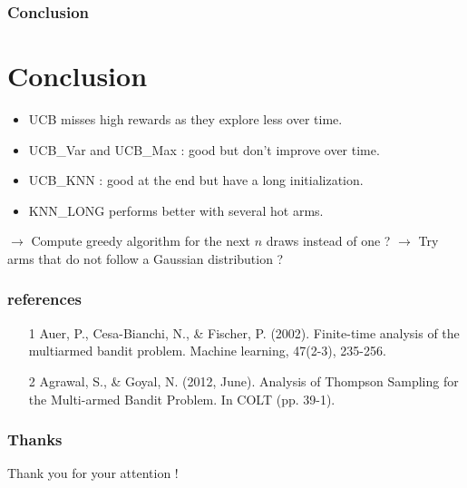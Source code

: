 \documentclass[french]{beamer}
\begin{document}
\begin{frame}
	\frametitle{Conclusion}
	
	\section{Conclusion}
	
	\begin{itemize}
		\item UCB misses high rewards as they explore less over time.
		
		\item UCB\_Var and UCB\_Max : good but don't improve over time.
		
		\item UCB\_KNN : good at the end but have a long initialization.
		
		\item KNN\_LONG performs better with several hot arms.
	\newline
	\end{itemize}

$\rightarrow$ Compute greedy algorithm for the next $n$ draws instead of one ?
$\rightarrow$ Try arms that do not follow a Gaussian distribution ?
	
\end{frame}

\begin{frame}
	\frametitle{references}
	
	
	\small{
		\begin{itemize}
		\item [1] Auer, P., Cesa-Bianchi, N., \& Fischer, P. (2002). Finite-time analysis of the multiarmed bandit problem. Machine learning, 47(2-3), 235-256.
		
		\item [2] Agrawal, S., \& Goyal, N. (2012, June). Analysis of Thompson Sampling for the Multi-armed Bandit Problem. In COLT (pp. 39-1).
		\end{itemize}
	}
\end{frame}
	
	\begin{frame}
	\frametitle{Thanks}
	
	Thank you for your attention !
	
	\end{frame}
\end{document}
